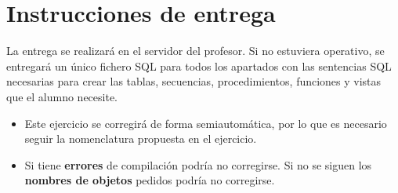 \section{Instrucciones de entrega}
La entrega se realizará en el servidor del profesor. Si no estuviera operativo, se entregará un único fichero SQL para todos los apartados con las sentencias SQL necesarias para crear las tablas, secuencias, procedimientos, funciones y vistas que el alumno necesite.
\begin{itemize}
\item Este ejercicio se corregirá de forma semiautomática, por lo que es necesario seguir la nomenclatura propuesta en el ejercicio.
\item Si tiene \textbf{errores} de compilación podría no corregirse. Si no se siguen los \textbf{nombres de objetos} pedidos podría no corregirse.
\end{itemize}








